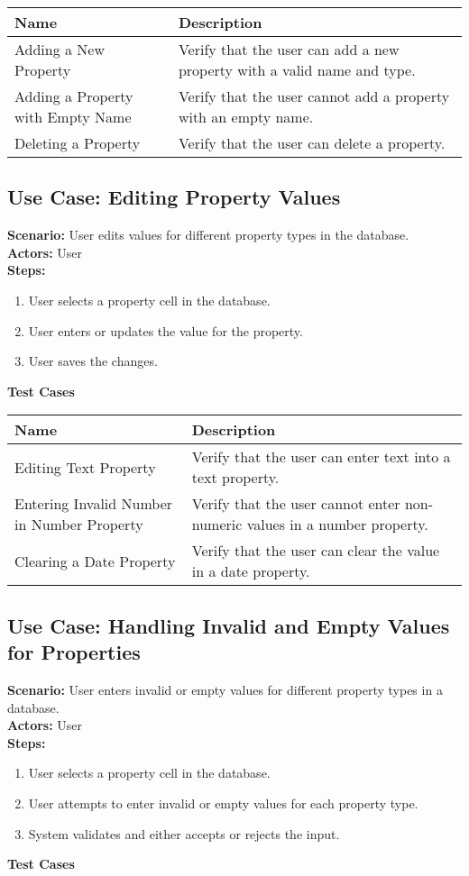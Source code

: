 \documentclass{article}
\begin{document}
            \begin{longtable}{|p{}|p{}|}
            \hline
            \textbf{Name} & \textbf{Description} \\
            \hline
            Adding a New Property & Verify that the user can add a new property with a valid name and type. \\
\hline
Adding a Property with Empty Name & Verify that the user cannot add a property with an empty name. \\
\hline
Deleting a Property & Verify that the user can delete a property. \\
\hline
\end{longtable}\subsection{\textbf{Use Case: Editing Property Values}}
\textbf{Scenario:} User edits values for different property types in the database.\\
\textbf{Actors:} User\\
\textbf{Steps:}
\begin{enumerate}
\item User selects a property cell in the database.
\item User enters or updates the value for the property.
\item User saves the changes.
\end{enumerate}
\textbf{Test Cases}

            \begin{longtable}{|p{}|p{}|}
            \hline
            \textbf{Name} & \textbf{Description} \\
            \hline
            Editing Text Property & Verify that the user can enter text into a text property. \\
\hline
Entering Invalid Number in Number Property & Verify that the user cannot enter non-numeric values in a number property. \\
\hline
Clearing a Date Property & Verify that the user can clear the value in a date property. \\
\hline
\end{longtable}\subsection{\textbf{Use Case: Handling Invalid and Empty Values for Properties}}
\textbf{Scenario:} User enters invalid or empty values for different property types in a database.\\
\textbf{Actors:} User\\
\textbf{Steps:}
\begin{enumerate}
\item User selects a property cell in the database.
\item User attempts to enter invalid or empty values for each property type.
\item System validates and either accepts or rejects the input.
\end{enumerate}
\textbf{Test Cases}
\end{document}
